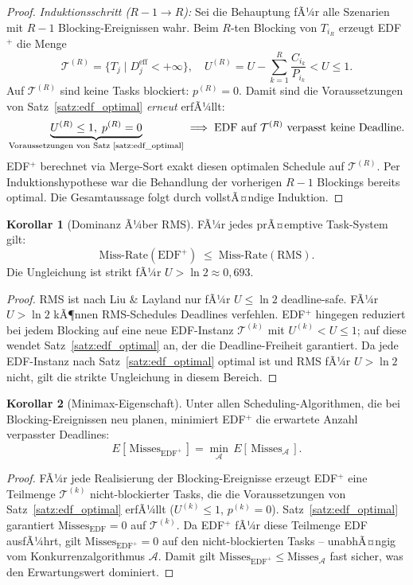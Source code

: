 ﻿\documentclass[a4paper,12pt]{article}
\theoremstyle{definition}
\newtheorem{korollar}{Korollar}
\begin{document}
\begin{proof}
		\emph{Induktionsschritt ($R-1 \to R$):}
		Sei die Behauptung fÃ¼r alle Szenarien mit $R-1$
		Blocking-Ereignissen wahr. Beim $R$-ten Blocking von $T_{i_R}$
		erzeugt EDF$^+$ die Menge
		\[
		\mathcal{T}^{(R)} = \bigl\{T_j \mid D_j^{\text{eff}} < +\infty\bigr\},
		\quad U^{(R)} = U - \sum_{k=1}^{R} \frac{C_{i_k}}{P_{i_k}} < U \le 1.
		\]
		Auf $\mathcal{T}^{(R)}$ sind keine Tasks blockiert: $p^{(R)} = 0$.
		Damit sind die Voraussetzungen von Satz~\ref{satz:edf_optimal}
		\emph{erneut} erfÃ¼llt:
		\[
		\underbrace{U^{(R)} \le 1,\; p^{(R)} = 0}_{%
		\text{Voraussetzungen von Satz~\ref{satz:edf_optimal}}}
		\;\Longrightarrow\;
		\text{EDF auf } \mathcal{T}^{(R)} \text{ verpasst keine Deadline.}
		\]
		EDF$^+$ berechnet via Merge-Sort exakt diesen optimalen Schedule auf
		$\mathcal{T}^{(R)}$. Per Induktionshypothese war die Behandlung der
		vorherigen $R-1$ Blockings bereits optimal. Die Gesamtaussage folgt
		durch vollstÃ¤ndige Induktion.
	\end{proof}

	\begin{korollar}[Dominanz Ã¼ber RMS]
		\label{kor:rms}
		FÃ¼r jedes prÃ¤emptive Task-System gilt:
		\[
		\text{Miss-Rate}(\text{EDF}^+) \;\le\; \text{Miss-Rate}(\text{RMS}).
		\]
		Die Ungleichung ist strikt fÃ¼r $U > \ln 2 \approx 0{,}693$.
	\end{korollar}

	\begin{proof}
		RMS ist nach Liu \& Layland \cite{Liu1973} nur fÃ¼r $U \le \ln 2$ deadline-safe.
		FÃ¼r $U > \ln 2$ kÃ¶nnen RMS-Schedules Deadlines verfehlen. EDF$^+$ hingegen
		reduziert bei jedem Blocking auf eine neue EDF-Instanz
		$\mathcal{T}^{(k)}$ mit $U^{(k)} < U \le 1$; auf diese wendet
		Satz~\ref{satz:edf_optimal} an, der die Deadline-Freiheit garantiert.
		Da jede EDF-Instanz nach Satz~\ref{satz:edf_optimal} optimal ist und
		RMS fÃ¼r $U > \ln 2$ nicht, gilt die strikte Ungleichung in diesem
		Bereich.
	\end{proof}

	\begin{korollar}[Minimax-Eigenschaft]
		Unter allen Scheduling-Algorithmen, die bei Blocking-Ereignissen neu planen,
		minimiert EDF$^+$ die erwartete Anzahl verpasster Deadlines:
		\[
		E[\,\text{Misses}_{\text{EDF}^+}\,] = \min_{\mathcal{A}} \,E[\,\text{Misses}_{\mathcal{A}}\,].
		\]
	\end{korollar}

	\begin{proof}
		FÃ¼r jede Realisierung der Blocking-Ereignisse erzeugt EDF$^+$ eine
		Teilmenge $\mathcal{T}^{(k)}$ nicht-blockierter Tasks, die die Voraussetzungen
		von Satz~\ref{satz:edf_optimal} erfÃ¼llt ($U^{(k)} \le 1$, $p^{(k)} = 0$).
		Satz~\ref{satz:edf_optimal} garantiert $\text{Misses}_{\text{EDF}} = 0$ auf
		$\mathcal{T}^{(k)}$. Da EDF$^+$ fÃ¼r diese Teilmenge EDF ausfÃ¼hrt, gilt
		$\text{Misses}_{\text{EDF}^+} = 0$ auf den nicht-blockierten Tasks
		-- unabhÃ¤ngig vom Konkurrenzalgorithmus $\mathcal{A}$.
		Damit gilt $\text{Misses}_{\text{EDF}^+} \le \text{Misses}_{\mathcal{A}}$
		fast sicher, was den Erwartungswert dominiert.
	\end{proof}
\end{document}

